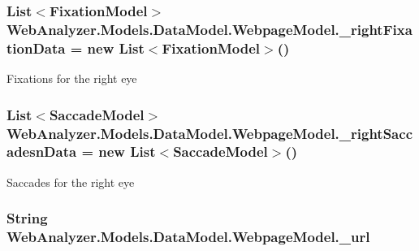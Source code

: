 \subsubsection[{\+\_\+right\+Fixation\+Data}]{\setlength{\rightskip}{0pt plus 5cm}List$<${\bf Fixation\+Model}$>$ Web\+Analyzer.\+Models.\+Data\+Model.\+Webpage\+Model.\+\_\+right\+Fixation\+Data = new List$<${\bf Fixation\+Model}$>$()\hspace{0.3cm}{\ttfamily [private]}}\label{class_web_analyzer_1_1_models_1_1_data_model_1_1_webpage_model_a5c341d7a7fd5074ddbd4cb7622914465}


Fixations for the right eye 

\hypertarget{class_web_analyzer_1_1_models_1_1_data_model_1_1_webpage_model_aa2ee1cf77db6f7e7f68fbf8c971109cf}{}
\subsubsection[{\+\_\+right\+Saccadesn\+Data}]{\setlength{\rightskip}{0pt plus 5cm}List$<${\bf Saccade\+Model}$>$ Web\+Analyzer.\+Models.\+Data\+Model.\+Webpage\+Model.\+\_\+right\+Saccadesn\+Data = new List$<${\bf Saccade\+Model}$>$()\hspace{0.3cm}{\ttfamily [private]}}\label{class_web_analyzer_1_1_models_1_1_data_model_1_1_webpage_model_aa2ee1cf77db6f7e7f68fbf8c971109cf}


Saccades for the right eye 

\hypertarget{class_web_analyzer_1_1_models_1_1_data_model_1_1_webpage_model_aea93808218833baaf68514071c973ae4}{}
\subsubsection[{\+\_\+url}]{\setlength{\rightskip}{0pt plus 5cm}String Web\+Analyzer.\+Models.\+Data\+Model.\+Webpage\+Model.\+\_\+url\hspace{0.3cm}{\ttfamily [private]}}\label{class_web_analyzer_1_1_models_1_1_data_model_1_1_webpage_model_aea93808218833baaf68514071c973ae4}



